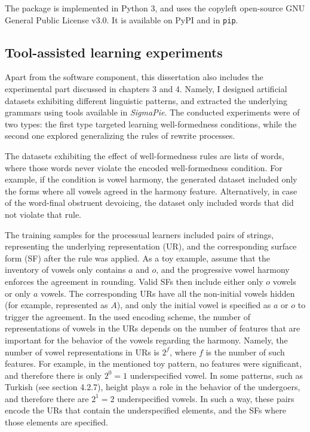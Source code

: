 The package is implemented in Python 3, and uses the copyleft open-source GNU General Public License v3.0.
It is available on PyPI and in \texttt{pip}.



\subsection{Tool-assisted learning experiments}

Apart from the software component, this dissertation also includes the experimental part discussed in chapters 3 and 4.
Namely, I designed artificial datasets exhibiting different linguistic patterns, and extracted the underlying grammars using tools available in \emph{SigmaPie}.
The conducted experiments were of two types: the first type targeted learning well-formedness conditions, while the second one explored generalizing the rules of rewrite processes.

The datasets exhibiting the effect of well-formedness rules are lists of words, where those words never violate the encoded well-formedness condition.
For example, if the condition is vowel harmony, the generated dataset included only the forms where all vowels agreed in the harmony feature.
Alternatively, in case of the word-final obstruent devoicing, the dataset only included words that did not violate that rule.

The training samples for the processual learners included pairs of strings, representing the underlying representation (UR), and the corresponding surface form (SF) after the rule was applied.
As a toy example, assume that the inventory of vowels only contains $a$ and $o$, and the progressive vowel harmony enforces the agreement in rounding.
Valid SFs then include either only $o$ vowels or only $a$ vowels.
The corresponding URs have all the non-initial vowels hidden (for example, represented as $A$), and only the initial vowel is specified as $a$ or $o$ to trigger the agreement.
In the used encoding scheme, the number of representations of vowels in the URs depends on the number of features that are important for the behavior of the vowels regarding the harmony.
Namely, the number of vowel representations in URs is $2^f$, where $f$ is the number of such features.
For example, in the mentioned toy pattern, no features were significant, and therefore there is only $2^0 = 1$ underspecified vowel.
In some patterns, such as Turkish (see section 4.2.7), height plays a role in the behavior of the undergoers, and therefore there are $2^1 = 2$ underspecified vowels.
In such a way, these pairs encode the URs that contain the underspecified elements, and the SFs where those elements are specified.

